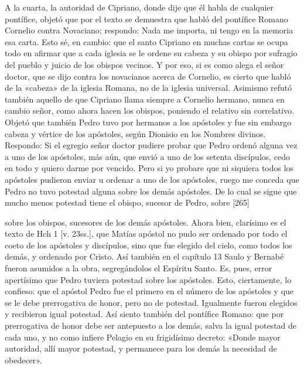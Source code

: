 A la cuarta, la autoridad de Cipriano, donde dije que él habla de cualquier pontífice, objetó que por el texto se demuestra que habló del pontífice Romano Cornelio contra Novaciano; respondo: Nada me importa, ni tengo en la memoria esa carta. Esto sé, en cambio: que el santo Cipriano en muchas cartas se ocupa todo en afirmar que a cada iglesia se le ordene su cabeza y su obispo por sufragio del pueblo y juicio de los obispos vecinos. Y por eso, si es como alega el señor doctor, que se dijo contra los novacianos acerca de Cornelio, es cierto que habló de la «cabeza» de la iglesia Romana, no de la iglesia universal. Asimismo refutó también aquello de que Cipriano llama siempre a Cornelio hermano, nunca en cambio señor, como ahora hacen los obispos, poniendo el relativo sin correlativo. Objetó que también Pedro tuvo por hermanos a los apóstoles y fue sin embargo cabeza y vértice de los apóstoles, según Dionisio en los Nombres divinos. Respondo: Si el egregio señor doctor pudiere probar que Pedro ordenó alguna vez a uno de los apóstoles, más aún, que envió a uno de los setenta discípulos, cedo en todo y quiero darme por vencido. Pero si yo probare que ni siquiera todos los apóstoles pudieron enviar u ordenar a uno de los apóstoles, ruego me conceda que Pedro no tuvo potestad alguna sobre los demás apóstoles. De lo cual se sigue que mucho menos potestad tiene el obispo, sucesor de Pedro, sobre [265]

sobre los obispos, sucesores de los demás apóstoles. Ahora bien, clarísimo es el texto de Hch 1 [v. 23ss.], que Matías apóstol no pudo ser ordenado por todo el coeto de los apóstoles y discípulos, sino que fue elegido del cielo, como todos los demás, y ordenado por Cristo. Así también en el capítulo 13 Saulo y Bernabé fueron asumidos a la obra, segregándolos el Espíritu Santo. Es, pues, error apertísimo que Pedro tuviera potestad sobre los apóstoles. Esto, ciertamente, lo confieso: que el apóstol Pedro fue el primero en el número de los apóstoles y que se le debe prerrogativa de honor, pero no de potestad. Igualmente fueron elegidos y recibieron igual potestad. Así siento también del pontífice Romano: que por prerrogativa de honor debe ser antepuesto a los demás, salva la igual potestad de cada uno, y no como infiere Pelagio en su frigidísimo decreto: «Donde mayor autoridad, allí mayor potestad, y permanece para los demás la necesidad de obedecer».

